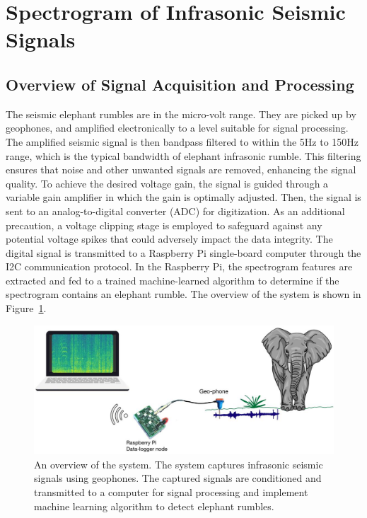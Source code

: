 \documentclass[applsci,article,accept,moreauthors,pdftex]{Definitions/mdpi}
\begin{document}
\section{Spectrogram of Infrasonic Seismic Signals}
\subsection{Overview of Signal Acquisition and Processing}
The seismic elephant rumbles are in the micro-volt range. They are picked up by geophones, and amplified electronically to a level suitable for signal processing. The amplified seismic signal is then bandpass filtered to within the 5Hz to 150Hz range, which is the typical bandwidth of elephant infrasonic rumble. This filtering ensures that noise and other unwanted signals are removed, enhancing the signal quality. To achieve the desired voltage gain, the signal is guided through a variable gain amplifier in which the gain is optimally adjusted. Then, the signal is sent to an analog-to-digital converter (ADC) for digitization. As an additional precaution, a voltage clipping stage is employed to safeguard against any potential voltage spikes that could adversely impact the data integrity. The digital signal is transmitted to a Raspberry Pi single-board computer through the I2C communication protocol. In the Raspberry Pi, the spectrogram features are extracted and fed to a trained machine-learned algorithm to determine if the spectrogram contains an elephant rumble. The overview of the system is shown in Figure~\ref{fig:dh-prodecrrnn}.
\begin{figure}
	\centering
	\includegraphics[width=0.9\columnwidth]{figures/overview.png} 
	\caption{An overview of the system. The system captures infrasonic seismic signals using geophones. The captured signals are conditioned and transmitted to a computer for signal processing and implement machine learning algorithm to detect elephant rumbles.} \label{fig:dh-prodecrrnn}
\end{figure}
\end{document}

